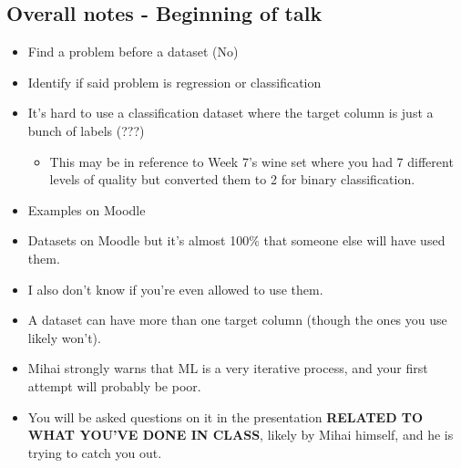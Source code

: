 \documentclass[12pt]{report}
\begin{document}
\subsection{Overall notes - Beginning of talk}
\begin{itemize}
    \item Find a problem before a dataset (No)
    \item Identify if said problem is regression or classification
    \item It's hard to use a classification dataset where the target column is just a bunch of labels (???)
    \begin{itemize}
        \item This may be in reference to Week 7's wine set where you had 7 different levels of quality but converted them to 2 for binary classification.
    \end{itemize}
    \item Examples on Moodle
    \item Datasets on Moodle but it's almost 100\% that someone else will have used them.
    \item I also don't know if you're even allowed to use them.
    \item A dataset can have more than one target column (though the ones you use likely won't).
    \item Mihai strongly warns that ML is a very iterative process, and your first attempt will probably be poor.
    \item You will be asked questions on it in the presentation \textbf{RELATED TO WHAT YOU'VE DONE IN CLASS}, likely
    by Mihai himself, and he is trying to catch you out.
\end{itemize}
\end{document}
